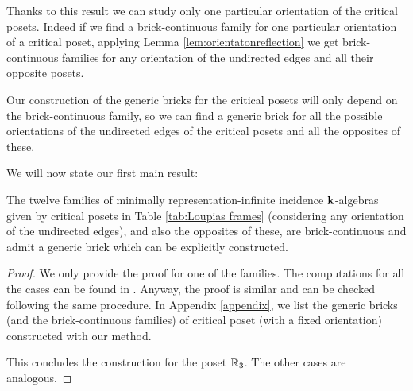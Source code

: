 \begin{remark}\label{rem:allorientations}
	Thanks to this result we can study only one particular orientation of the critical posets. Indeed if we find a brick-continuous family for one particular orientation of a critical poset, applying Lemma \ref{lem:orientatonreflection} we get brick-continuous families for any orientation of the undirected edges and all their opposite posets.
	
	Our construction of the generic bricks for the critical posets will only depend on the brick-continuous family, so we can find a generic brick for all the possible orientations of the undirected edges of the critical posets and all the opposites of these.
\end{remark}
 
We will now state our first main result:

\begin{theorem}\label{thm:genbrickcritical}
	The twelve families of minimally representation-infinite incidence $\mathbf{k}$-algebras given by critical posets in Table \ref{tab:Loupias frames} (considering any orientation of the undirected edges), and also the opposites of these, are brick-continuous and admit a generic brick which can be explicitly constructed.
\end{theorem}

\begin{proof}
	We only provide the proof for one of the families. The computations for all the cases can be found in \cite[Appendix]{tacchetti2025masterthesis}. Anyway, the proof is similar and can be checked following the same procedure. In Appendix \ref{appendix}, we list the generic bricks (and the brick-continuous families) of critical poset (with a fixed orientation) constructed with our method.
	
	
	
	This concludes the construction for the poset $\mathbb{R}_3$. The other cases are analogous.
\end{proof}
